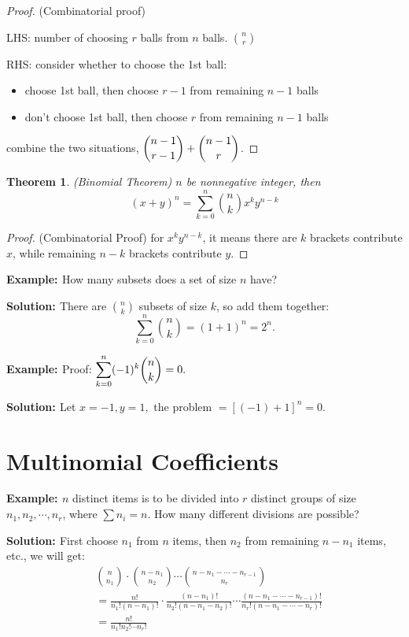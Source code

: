 \documentclass[11pt, a4paper]{MATH2421}
\newtheorem*{theorem}{Theorem}
\newcommand{\eg}{{\bf {Example: }}}
\newcommand{\sol}{{\bf {Solution: }}}
\begin{document}
\begin{spacing}{1.3}
\begin{proof}
        (Combinatorial proof)

        LHS: number of choosing $r$ balls from $n$ balls. 
        ${n\choose r}$

        RHS: consider whether to choose the 1st ball:
        \begin{itemize}
            \item choose 1st ball, then choose $r-1$ from remaining
            $n-1$ balls
            \item don't choose 1st ball, then choose $r$ from remaining
            $n-1$ balls
        \end{itemize}
        combine the two situations, $\displaystyle {n-1\choose r-1}+{n-1\choose r}$.

    \end{proof}

    \begin{theorem}
        (Binomial Theorem) 
        $n$ be nonnegative integer, then
        $$(x+y)^n=\sum_{k=0}^{n}{n\choose k}x^ky^{n-k}$$
    \end{theorem}

    \begin{proof}
        (Combinatorial Proof) for $x^ky^{n-k}$, it means 
        there are $k$ brackets contribute $x$, while 
        remaining $n-k$ brackets contribute $y$.
    \end{proof}

    \eg How many subsets does a set of size $n$ have?

    \sol There are ${n\choose k}$ subsets of size $k$,
    so add them together:
    $$\sum_{k=0}^{n}{n\choose k}=(1+1)^n=2^n.$$

    \eg Proof: $\displaystyle \sum_{k=0}^{n}(-1)^k{n\choose k}=0.$

    \sol Let $x=-1, y=1,$ the problem $=[(-1)+1]^n=0$.
    

    \section{Multinomial Coefficients}

    \eg $n$ distinct items is to be divided into $r$ distinct
    groups of size $n_1, n_2,\cdots ,n_r$, where 
    $\sum n_i=n$. How many different divisions are possible?

    \sol First choose $n_1$ from $n$ items, then $n_2$ from 
    remaining $n-n_1$ items, etc., we will get:
    \begin{align*}
        &{n\choose n_1}\cdot {n-n_1\choose n_2}\cdots 
        {n-n_1-\cdots -n_{r-1}\choose n_r}\\
        &=\frac{n!}{n_1!(n-n_1)!}\cdot \frac{(n-n_1)!}{n_2!(n-n_1-n_2)!}
        \cdots \frac{(n-n_1-\cdots-n_{r-1})!}{n_r!(n-n_1-\cdots-n_r)!}\\
        &=\frac{n!}{n_1!n_2!\cdots n_r!}
    \end{align*}


\end{spacing}
\end{document}
